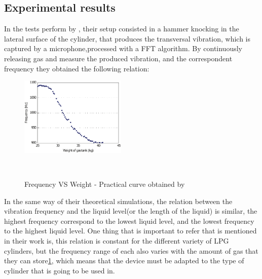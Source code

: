\subsection{Experimental results}\label{subsec:SOAExpRes}
In the tests perform by \citeauthor{wuLiquidLevelDetector2014b}, their setup consisted in a hammer knocking in the lateral surface of the cylinder, that produces the transversal vibration, which is captured by a microphone,processed with a FFT algorithm. By continuously releasing gas and measure the produced vibration, and the correspondent frequency they obtained the following relation: 
\begin{figure}[]
    \centering
    \includegraphics[width=0.45\textwidth]{Chapters/2CHP/Diagrams/weightvsfrequency.pdf}
    \caption{Frequency VS Weight - Practical curve obtained by}{~\citeauthor{wuLiquidLevelDetector2014b}}
    \label{fig:practCurve}
\end{figure}
In the same way of their theoretical simulations, the relation between the vibration frequency and the liquid level(or the length of the liquid) is similar, the highest frequency correspond to the lowest liquid level, and the lowest frequency to the highest liquid level. One thing that is important to refer that is mentioned in their work is, this relation is constant for the different variety of LPG cylinders, but the frequency range of each also varies with the amount of gas that they can store\ref{fig:practCurve}, which means that the device must be adapted to the type of cylinder that is going to be used in. 
